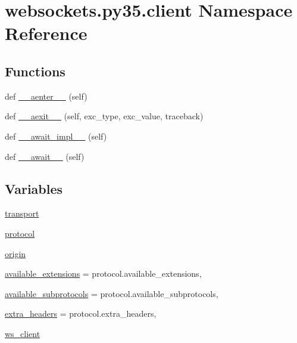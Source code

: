 \hypertarget{namespacewebsockets_1_1py35_1_1client}{}\section{websockets.\+py35.\+client Namespace Reference}
\label{namespacewebsockets_1_1py35_1_1client}
\subsection*{Functions}
\begin{DoxyCompactItemize}
\item 
def \hyperlink{namespacewebsockets_1_1py35_1_1client_a40ff411618ec0c37eaf7bab4b1b65390}{\+\_\+\+\_\+aenter\+\_\+\+\_\+} (self)
\item 
def \hyperlink{namespacewebsockets_1_1py35_1_1client_af7aa5d80257aa9410fa05862e14d68b5}{\+\_\+\+\_\+aexit\+\_\+\+\_\+} (self, exc\+\_\+type, exc\+\_\+value, traceback)
\item 
def \hyperlink{namespacewebsockets_1_1py35_1_1client_a0eaefdf545189df00aea785e7951c0b4}{\+\_\+\+\_\+await\+\_\+impl\+\_\+\+\_\+} (self)
\item 
def \hyperlink{namespacewebsockets_1_1py35_1_1client_abf305ff009cfe668c825ca0632befa21}{\+\_\+\+\_\+await\+\_\+\+\_\+} (self)
\end{DoxyCompactItemize}
\subsection*{Variables}
\begin{DoxyCompactItemize}
\item 
\hyperlink{namespacewebsockets_1_1py35_1_1client_a99393a72a9a76e791d48c6acef0c6bb5}{transport}
\item 
\hyperlink{namespacewebsockets_1_1py35_1_1client_a9c731ec14cd0cbc624165a2bd8f83c0e}{protocol}
\item 
\hyperlink{namespacewebsockets_1_1py35_1_1client_aed4e5ee87a7c438456b2ab085ee61de6}{origin}
\item 
\hyperlink{namespacewebsockets_1_1py35_1_1client_a4f43ea5f65a1abf3f722ec8b09f00ea0}{available\+\_\+extensions} = protocol.\+available\+\_\+extensions,
\item 
\hyperlink{namespacewebsockets_1_1py35_1_1client_a6436d8ab326c450bb2a1e0283d792389}{available\+\_\+subprotocols} = protocol.\+available\+\_\+subprotocols,
\item 
\hyperlink{namespacewebsockets_1_1py35_1_1client_a2aebb975c78917934e240d989928f164}{extra\+\_\+headers} = protocol.\+extra\+\_\+headers,
\item 
\hyperlink{namespacewebsockets_1_1py35_1_1client_abfc4d319f559916c23b487466f0a5de6}{ws\+\_\+client}
\end{DoxyCompactItemize}


